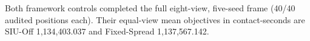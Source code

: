 Both framework controls completed the full eight-view, five-seed frame (40/40 audited positions each). Their equal-view mean objectives in contact-seconds are SIU-Off 1,134,403.037 and Fixed-Spread 1,137,567.142.
